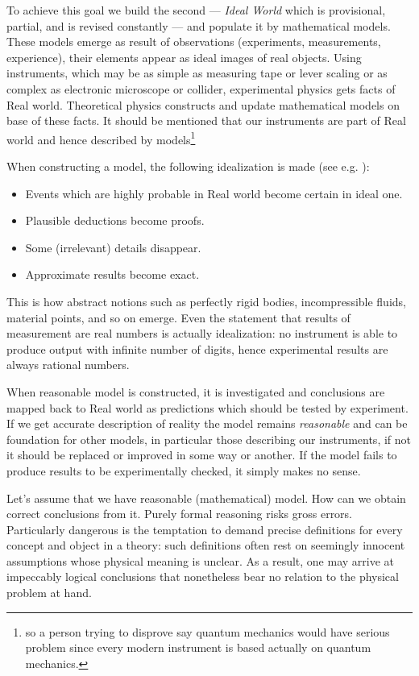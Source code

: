 To achieve this goal we build the second --- \emph{Ideal World} which is
provisional, partial, and  is revised constantly --- and populate it by
mathematical models. These models emerge as result of  observations
(experiments, measurements, experience), their elements appear as ideal images
of real objects. Using instruments, which may be as simple as measuring tape or
lever scaling or as complex as electronic microscope or collider, experimental
physics gets facts of Real world. Theoretical physics constructs and update
mathematical models on base of these facts. It should be mentioned that our
instruments are part of Real world  and hence described by models\footnote{so a
person trying to disprove say quantum mechanics would have serious problem
since every modern instrument is based actually on quantum mechanics.}

When constructing a model, the following idealization is
made (see e.g. \cite{Arnold-mt}): 
\begin{itemize}
    \item Events which are  highly probable in Real world become certain in ideal one.
    \item Plausible deductions become proofs.
    \item Some (irrelevant) details disappear.
    \item Approximate results become exact.
\end{itemize}               

This is how abstract notions such as perfectly rigid bodies, incompressible
fluids, material points, and so on emerge. Even the statement that results of
measurement are real numbers is actually idealization: no instrument is able to
produce output with infinite number of digits, hence experimental results are
always rational numbers.

When reasonable model is constructed, it is investigated and conclusions are
mapped back to Real world as predictions which should be tested by  experiment.
If we get  accurate description of reality the model remains {\em reasonable}
and can be foundation for other models, in particular those describing our
instruments, if not it  should be replaced or improved in some way or another.
If the model fails to produce results to be experimentally checked, it simply
makes no sense.

Let's assume that we have reasonable (mathematical) model. How can we obtain
correct conclusions from it. Purely formal reasoning risks gross errors.
Particularly dangerous is the temptation to demand precise  definitions for
every concept and object in a theory: such definitions often rest on seemingly
innocent assumptions whose physical meaning is unclear. As a result, one may
arrive at impeccably logical conclusions that nonetheless bear no relation to
the physical problem at hand.

